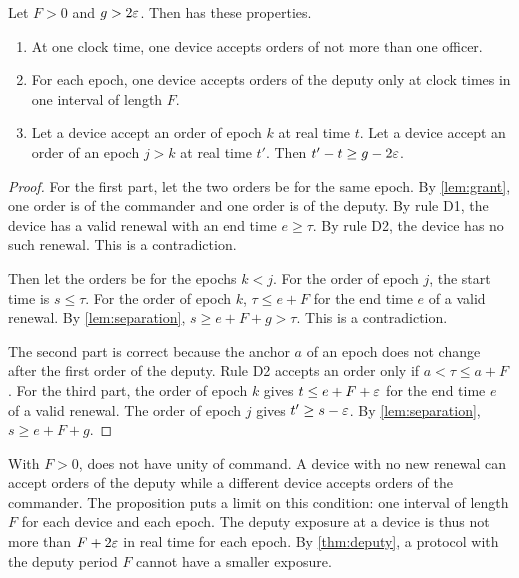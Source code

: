 \begin{prp}[Fallback]
\label{prp:fallback}
Let $F > 0$ and $g > 2\varepsilon$. Then \sys{} has these properties.
\begin{enumerate}
  \item At one clock time, one device accepts orders of not more than one officer.
  \item For each epoch, one device accepts orders of the deputy only at clock times in one
  interval of length $F$.
  \item Let a device accept an order of epoch $k$ at real time $t$. Let a device accept an
  order of an epoch $j > k$ at real time $t'$. Then $t' - t \ge g - 2\varepsilon$.
\end{enumerate}
\end{prp}

\begin{proof}
For the first part, let the two orders be for the same epoch. By \cref{lem:grant}, one
order is of the commander and one order is of the deputy. By rule D1, the device has a
valid renewal with an end time $e \ge \tau$. By rule D2, the device has no such renewal.
This is a contradiction.

Then let the orders be for the epochs $k < j$. For the order of epoch $j$, the start time
is $s \le \tau$. For the order of epoch $k$, $\tau \le e + F$ for the end time $e$ of a
valid renewal. By \cref{lem:separation}, $s \ge e + F + g > \tau$. This is a
contradiction.

The second part is correct because the anchor $a$ of an epoch does not change after the
first order of the deputy. Rule D2 accepts an order only if $a < \tau \le a + F$. For the third part, the
order of epoch $k$ gives $t \le e + F + \varepsilon$ for the end time $e$ of a valid renewal. The
order of epoch $j$ gives $t' \ge s - \varepsilon$. By \cref{lem:separation}, $s \ge e + F + g$.
\end{proof}

With $F > 0$, \sys{} does not have unity of command. A device with no new renewal can
accept orders of the deputy while a different device accepts orders of the commander. The
proposition puts a limit on this condition: one interval of length $F$ for each device and
each epoch. The deputy exposure at a device is thus not more than $F + 2\varepsilon$ in real time
for each epoch. By \cref{thm:deputy}, a protocol with the deputy period $F$ cannot have a
smaller exposure.
